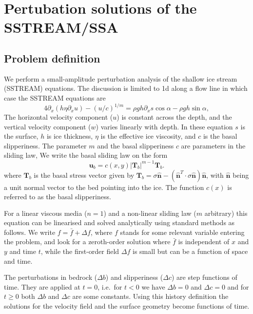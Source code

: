 \documentclass[10pt,a4paper]{book}
\newcommand{\p}{\partial}
\newcommand{\normal}{\hat{\bm{n}}}
\begin{document}
\chapter{Pertubation solutions of the SSTREAM/SSA}

\section{Problem definition}
We perform a small-amplitude perturbation analysis of the shallow ice
stream (SSTREAM) equations. The discussion is limited to 1d along a
flow line in which case the SSTREAM equations are
\begin{equation}
4 \p_x (h \eta \p_x u)  - (u/c)^{1/m}
=\rho g h \p_x s \cos \alpha  - \rho g h \sin \alpha ,\label{eq:Mcx} 
\end{equation}
The horizontal velocity component ($u$) is constant across the depth,
and the vertical velocity component ($w$) varies linearly with depth.
In these equation $s$ is the surface, $h$ is ice thickness, $\eta$ is
the effective ice viscosity, and $c$ is the basal slipperiness. The
parameter $m$ and the basal slipperiness $c$ are parameters in the
sliding law, We write the basal sliding law on the form
\begin{equation}
\mathbf{u}_b=c(x,y) |\mathbf{T}_b|^{m-1} \mathbf{T}_b.
\label{eq:slidlaw}
\end{equation}
where $\mathbf{T}_b$ is the basal stress vector given by
$\mathbf{T}_b=\sigma
\normal-(\normal^T \cdot \sigma \normal)
\normal$, with $\normal$ being a unit normal vector to the bed pointing into the
ice. The function $c(x)$ is referred to as the basal slipperiness.

For a linear viscous media ($n=1$) and a non-linear sliding law ($m$
arbitrary) this equation can be linearised and solved analytically
using standard methods as follows.  We write $f=\bar{f}+\Delta f$,
where $f$ stands for some relevant variable entering the problem, and
look for a zeroth-order solution where $\bar{f}$ is independent of $x$
and $y$ and time $t$, while the first-order field $\Delta f$ is small
but can be a function of space and time.  

The perturbations in bedrock ($\Delta b$) and slipperiness ($\Delta
c$) are step functions of time. They are applied at $t=0$, i.e.\ for
$t<0$ we have $\Delta b=0$ and $\Delta c=0$ and for $t \ge 0$ both
$\Delta b$ and $\Delta c$ are some constants.  Using this history
definition the solutions for the velocity field and the surface
geometry become functions of time.
\end{document}

